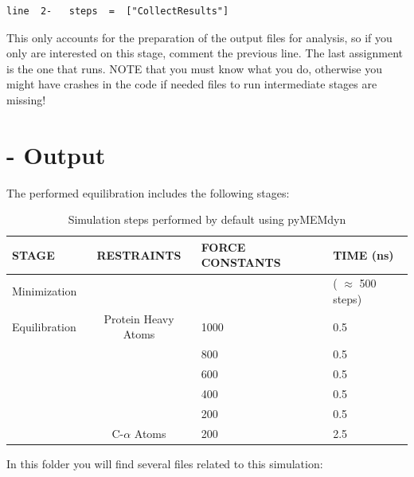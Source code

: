 \documentclass[10pt, oneside, pdftex]{article}
\begin{document}
\begin{Verbatim}
line  2-   steps  =  ["CollectResults"]  
\end{Verbatim}

This  only accounts for the  preparation of the output files  for analysis, so if
you only are interested on  this stage, comment the previous line. The
last assignment  is the one that  runs.  NOTE that you  must know what
you do, otherwise  you might have crashes in the  code if needed files
to  run  intermediate  stages   are  missing!   


\section*{ - Output}  
The  performed equilibration includes the following stages:

\begin{table}[htbp]
\centering
\small\addtolength{\tabcolsep}{-2pt}
\begin{tabular}{p{1.8cm}|c|p{1.9cm}|p{2.0cm}}
\hline
\textbf{STAGE} & \textbf{RESTRAINTS} & \textbf{FORCE CONSTANTS} & \textbf{TIME} (ns)  \\ \hline
Minimization   &                   &                 & ( $\approx$ 500 steps)\\ \hline
Equilibration  & Protein Heavy Atoms & 1000          & 0.5\\
               &  & 800      & 0.5\\
               &  & 600      & 0.5\\
               &  & 400      & 0.5\\
               &  & 200      & 0.5\\
               & C-$\alpha$ Atoms & 200      & 2.5\\ \hline
\end{tabular}
\parbox{5.8in}{\caption{\footnotesize{Simulation steps performed by default using pyMEMdyn}}}
\label{tab:equilibration}
\end{table}

In this folder you will find several files related to this simulation:
\end{document}
